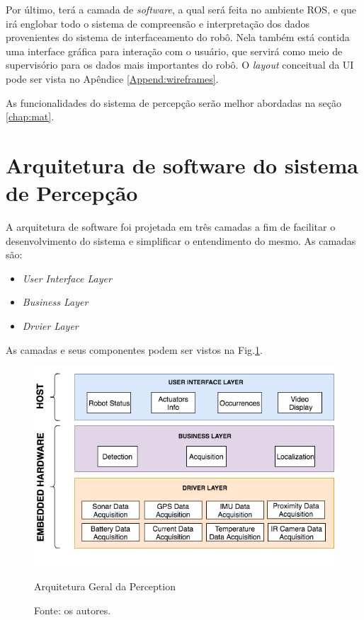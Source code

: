  
 Por último, terá a camada de \textit{software}, a qual será feita no ambiente ROS, e que irá englobar todo o sistema de compreensão e interpretação dos dados provenientes do sistema de interfaceamento do robô. Nela também está contida uma interface gráfica para interação com o usuário, que servirá como meio de supervisório para os dados mais importantes do robô. O \textit{layout} conceitual da UI pode ser vista no Apêndice \ref{Append:wireframes}. 
 
 As funcionalidades do sistema de percepção serão melhor abordadas na seção \ref{chap:mat}.
 

\section{Arquitetura de software do sistema de Percepção}
\label{ssec:arqsp}


A arquitetura de software foi projetada em três camadas a fim de facilitar o desenvolvimento do sistema e simplificar o entendimento do mesmo. As camadas são:

\begin{itemize}
	\item \textit{User Interface Layer}
	\item \textit{Business Layer}
	\item \textit{Drvier Layer}
\end{itemize}
 
As camadas e seus componentes podem ser vistos na Fig.\ref{arqsoft}.

\begin{figure}[h]
	\centering
	\includegraphics[width=15cm]{Figures/ArquiteturadeSoftware.png}
	\caption{Arquitetura Geral da Perception}
	\caption*{Fonte: os autores.}
	\label{arqsoft}
\end{figure}

